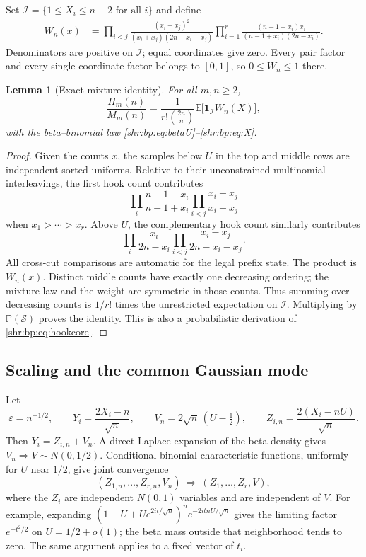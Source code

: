 \documentclass[11pt,letterpaper]{article}
\numberwithin{equation}{section}
\newtheorem{lemma}[theorem]{Lemma}
\theoremstyle{definition}
\newcommand{\E}{\mathbb E}
\newcommand{\1}{\mathbf 1}
\newcommand{\eps}{\varepsilon}
\newcommand{\PP}{\mathbb P}
\newcommand{\ind}{\mathbf 1}
\begin{document}
Set $\mathcal I=\{1\le X_i\le n-2\text{ for all }i\}$ and define
\begin{align}
 W_n(x)&=
 \prod_{i<j}\frac{(x_i-x_j)^2}{(x_i+x_j)(2n-x_i-x_j)}
 \prod_{i=1}^{r}
 \frac{(n-1-x_i)x_i}{(n-1+x_i)(2n-x_i)}.
 \label{shr:bp:eq:W}
\end{align}
Denominators are positive on $\mathcal I$; equal coordinates give zero.
Every pair factor and every single-coordinate factor belongs to $[0,1]$,
so $0\le W_n\le1$ there.

\begin{lemma}[Exact mixture identity]
\label{shr:bp:lem:mixture}
For all $m,n\ge2$,
\begin{equation}
 \frac{H_m(n)}{M_m(n)}=
 \frac{1}{r!\binom{2n}{n}}
 \E\bigl[\ind_{\mathcal I}W_n(X)\bigr],
 \label{shr:bp:eq:mixture}
\end{equation}
with the beta--binomial law \eqref{shr:bp:eq:betaU}--\eqref{shr:bp:eq:X}.
\end{lemma}
\begin{proof}
Given the counts $x$, the samples below $U$ in the top and middle rows
are independent sorted uniforms. Relative to their unconstrained
multinomial interleavings, the first hook count contributes
\[
 \prod_i\frac{n-1-x_i}{n-1+x_i}
 \prod_{i<j}\frac{x_i-x_j}{x_i+x_j}
\]
when $x_1>\cdots>x_r$. Above $U$, the complementary hook count similarly
contributes
\[
 \prod_i\frac{x_i}{2n-x_i}
 \prod_{i<j}\frac{x_i-x_j}{2n-x_i-x_j}.
\]
All cross-cut comparisons are automatic for the legal prefix state.
The product is $W_n(x)$. Distinct middle counts have exactly one decreasing
ordering; the mixture law and the weight are symmetric in those counts.
Thus summing over decreasing counts is $1/r!$ times the unrestricted
expectation on $\mathcal I$. Multiplying by $\PP(\mathcal S)$ proves the
identity. This is also a probabilistic derivation of \eqref{shr:bp:eq:hookcore}.
\end{proof}

\subsection{Scaling and the common Gaussian mode}
Let
\begin{equation}
 \eps=n^{-1/2},\qquad Y_i=\frac{2X_i-n}{\sqrt n},\qquad
 V_n=2\sqrt n\,(U-\tfrac12),\qquad
 Z_{i,n}=\frac{2(X_i-nU)}{\sqrt n}.
 \label{shr:bp:eq:scaling}
\end{equation}
Then $Y_i=Z_{i,n}+V_n$. A direct Laplace expansion of the beta density gives
$V_n\Rightarrow V\sim N(0,1/2)$. Conditional binomial characteristic
functions, uniformly for $U$ near $1/2$, give joint convergence
\begin{equation}
 (Z_{1,n},\ldots,Z_{r,n},V_n)
 \ \Rightarrow\ (Z_1,\ldots,Z_r,V),
 \label{shr:bp:eq:CLT}
\end{equation}
where the $Z_i$ are independent $N(0,1)$ variables and are independent of
$V$. For example, expanding
$(1-U+Ue^{2it/\sqrt n})^n e^{-2itnU/\sqrt n}$ gives the limiting factor
$e^{-t^2/2}$ on $U=1/2+o(1)$; the beta mass outside that neighborhood tends
to zero. The same argument applies to a fixed vector of $t_i$.
\end{document}
